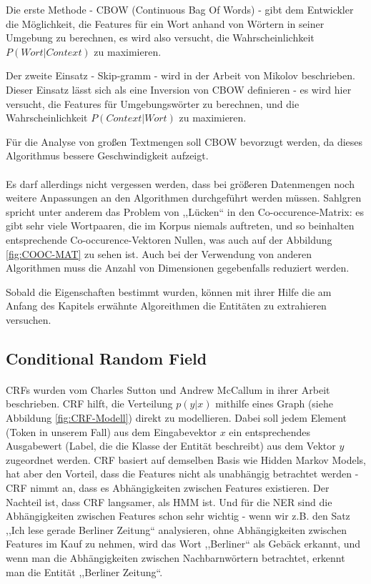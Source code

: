 Die erste Methode - CBOW (Continuous Bag Of Words\cite{garcia2014word}) - gibt dem Entwickler die Möglichkeit, die Features für ein Wort anhand von Wörtern in seiner Umgebung zu berechnen, es wird also versucht, die Wahrscheinlichkeit $P(Wort|Context)$ zu maximieren.

Der zweite Einsatz - Skip-gramm - wird in der Arbeit von Mikolov\cite{mikolov2013distributed} beschrieben. Dieser Einsatz lässt sich als eine Inversion von CBOW  definieren - es wird hier versucht, die Features für Umgebungswörter zu berechnen, und die Wahrscheinlichkeit $P(Context|Wort)$ zu maximieren.

Für die Analyse von großen Textmengen soll CBOW bevorzugt werden, da dieses Algorithmus bessere Geschwindigkeit aufzeigt\cite{wang2014introduction}. 

\paragraph{}
Es darf allerdings nicht vergessen werden, dass bei größeren Datenmengen noch weitere Anpassungen an den Algorithmen durchgeführt werden müssen. Sahlgren\cite{sahlgren2006word} spricht unter anderem das Problem von ,,Lücken`` in den Co-occurence-Matrix: es gibt sehr viele Wortpaaren, die im Korpus niemals auftreten, und so beinhalten entsprechende Co-occurence-Vektoren Nullen, was auch auf der Abbildung \ref{fig:COOC-MAT} zu sehen ist. Auch bei der Verwendung von anderen Algorithmen muss die Anzahl von Dimensionen gegebenfalls reduziert werden.  

Sobald die Eigenschaften bestimmt wurden, können mit ihrer Hilfe die am Anfang des Kapitels erwähnte Algoreithmen die Entitäten zu extrahieren versuchen.

\subsection{Conditional Random Field}
\paragraph{}
CRFs wurden vom Charles Sutton und Andrew McCallum in ihrer Arbeit\cite{Charles/Andrew:10} beschrieben. CRF hilft, die Verteilung $p(y|x)$ mithilfe eines Graph (siehe Abbildung \ref{fig:CRF-Modell}) direkt zu modellieren. Dabei soll jedem Element (Token in unserem Fall) aus dem Eingabevektor $x$ ein entsprechendes Ausgabewert (Label, die die Klasse der Entität beschreibt) aus dem Vektor $y$ zugeordnet werden. CRF basiert auf demselben Basis wie Hidden Markov Models, hat aber den Vorteil, dass die Features nicht als unabhängig betrachtet werden - CRF nimmt an, dass es Abhängigkeiten zwischen Features existieren. Der Nachteil ist, dass CRF langsamer, als HMM ist. Und für die NER sind die Abhängigkeiten zwischen Features schon sehr wichtig - wenn wir z.B. den Satz ,,Ich lese gerade Berliner Zeitung`` analysieren, ohne Abhängigkeiten zwischen Features im Kauf zu nehmen, wird das Wort ,,Berliner`` als Gebäck erkannt, und wenn man die Abhängigkeiten zwischen Nachbarnwörtern betrachtet, erkennt man die Entität ,,Berliner Zeitung``.

